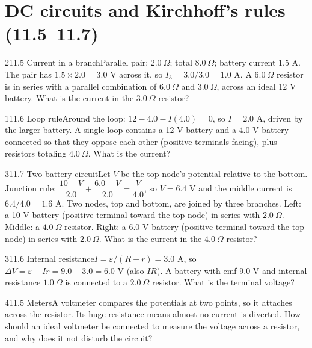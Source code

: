 \documentclass[11pt]{article}
\begin{document}
\section{DC circuits and Kirchhoff's rules (11.5--11.7)}

\begin{q}{2}{11.5 Current in a branch}{Parallel pair: $2.0\ \Omega$; total $8.0\ \Omega$; battery current 1.5 A. The pair has $1.5 \times 2.0 = 3.0$ V across it, so $I_3 = 3.0/3.0 = 1.0$ A.}
A $6.0\ \Omega$ resistor is in series with a parallel combination of $6.0\ \Omega$ and $3.0\ \Omega$, across an ideal 12 V battery. What is the current in the $3.0\ \Omega$ resistor?
\end{q}
\begin{q}{1}{11.6 Loop rule}{Around the loop: $12 - 4.0 - I(4.0) = 0$, so $I = 2.0$ A, driven by the larger battery.}
A single loop contains a 12 V battery and a 4.0 V battery connected so that they oppose each other (positive terminals facing), plus resistors totaling $4.0\ \Omega$. What is the current?
\end{q}
\begin{q}{3}{11.7 Two-battery circuit}{Let $V$ be the top node's potential relative to the bottom. Junction rule: $\dfrac{10 - V}{2.0} + \dfrac{6.0 - V}{2.0} = \dfrac{V}{4.0}$, so $V = 6.4$ V and the middle current is $6.4/4.0 = 1.6$ A.}
Two nodes, top and bottom, are joined by three branches. Left: a 10 V battery (positive terminal toward the top node) in series with $2.0\ \Omega$. Middle: a $4.0\ \Omega$ resistor. Right: a 6.0 V battery (positive terminal toward the top node) in series with $2.0\ \Omega$. What is the current in the $4.0\ \Omega$ resistor?
\end{q}
\begin{q}{3}{11.6 Internal resistance}{$I = \varepsilon/(R + r) = 3.0$ A, so $\Delta V = \varepsilon - Ir = 9.0 - 3.0 = 6.0$ V (also $IR$).}
A battery with emf 9.0 V and internal resistance $1.0\ \Omega$ is connected to a $2.0\ \Omega$ resistor. What is the terminal voltage?
\end{q}
\begin{q}{4}{11.5 Meters}{A voltmeter compares the potentials at two points, so it attaches across the resistor. Its huge resistance means almost no current is diverted.}
How should an ideal voltmeter be connected to measure the voltage across a resistor, and why does it not disturb the circuit?
\end{q}
\end{document}

